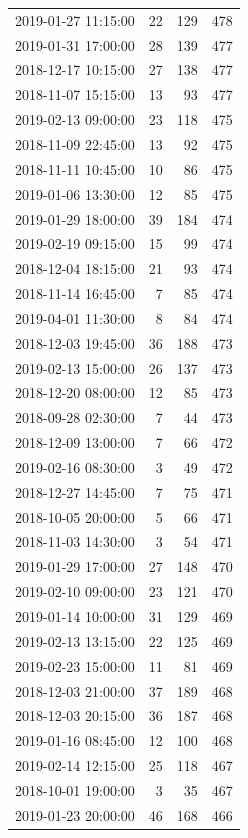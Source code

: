 \begin{tabular}{lrrr}
2019-01-27 11:15:00 & 22 & 129 & 478 \\
2019-01-31 17:00:00 & 28 & 139 & 477 \\
2018-12-17 10:15:00 & 27 & 138 & 477 \\
2018-11-07 15:15:00 & 13 & 93 & 477 \\
2019-02-13 09:00:00 & 23 & 118 & 475 \\
2018-11-09 22:45:00 & 13 & 92 & 475 \\
2018-11-11 10:45:00 & 10 & 86 & 475 \\
2019-01-06 13:30:00 & 12 & 85 & 475 \\
2019-01-29 18:00:00 & 39 & 184 & 474 \\
2019-02-19 09:15:00 & 15 & 99 & 474 \\
2018-12-04 18:15:00 & 21 & 93 & 474 \\
2018-11-14 16:45:00 & 7 & 85 & 474 \\
2019-04-01 11:30:00 & 8 & 84 & 474 \\
2018-12-03 19:45:00 & 36 & 188 & 473 \\
2019-02-13 15:00:00 & 26 & 137 & 473 \\
2018-12-20 08:00:00 & 12 & 85 & 473 \\
2018-09-28 02:30:00 & 7 & 44 & 473 \\
2018-12-09 13:00:00 & 7 & 66 & 472 \\
2019-02-16 08:30:00 & 3 & 49 & 472 \\
2018-12-27 14:45:00 & 7 & 75 & 471 \\
2018-10-05 20:00:00 & 5 & 66 & 471 \\
2018-11-03 14:30:00 & 3 & 54 & 471 \\
2019-01-29 17:00:00 & 27 & 148 & 470 \\
2019-02-10 09:00:00 & 23 & 121 & 470 \\
2019-01-14 10:00:00 & 31 & 129 & 469 \\
2019-02-13 13:15:00 & 22 & 125 & 469 \\
2019-02-23 15:00:00 & 11 & 81 & 469 \\
2018-12-03 21:00:00 & 37 & 189 & 468 \\
2018-12-03 20:15:00 & 36 & 187 & 468 \\
2019-01-16 08:45:00 & 12 & 100 & 468 \\
2019-02-14 12:15:00 & 25 & 118 & 467 \\
2018-10-01 19:00:00 & 3 & 35 & 467 \\
2019-01-23 20:00:00 & 46 & 168 & 466 \\

\end{tabular}
